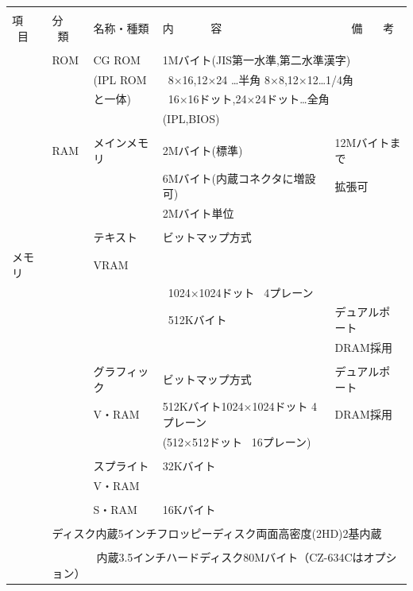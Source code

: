 \documentclass[twoside,a4paper,12pt]{article}
\begin{document}
\setlength{\tabcolsep}{0.5mm}
\begin{tabular}{|p{17mm}|p{13mm}|p{23mm}|p{80mm}|p{30mm}|}
\hline
& & & &\\[-2mm]
項 \ 目& 分 \ 類 & 名称・種類 & 内 \ \ \ \ \ \ 容 & \ \ \ 備 \ \ \ 考\\[1mm]
\hline
& & & \multicolumn{2}{l|}{}\\[-3mm]
& ROM & CG ROM & \multicolumn{2}{l|}{1Mバイト(JIS第一水準,第二水準漢字)}\\
& & (IPL ROM & \multicolumn{2}{l|}{\ 8×16,12×24 …半角 8×8,12×12…1/4角}\\
& & と一体) & \multicolumn{2}{l|}{\ 16×16ドット,24×24ドット…全角}\\
& & & \multicolumn{2}{l|}{(IPL,BIOS)}\\
\cline{2-5}
& & & &\\[-3mm]
& RAM & メインメモリ & 2Mバイト(標準) & 12Mバイトまで\\
& & & 6Mバイト(内蔵コネクタに増設可) & 拡張可\\
& & & 2Mバイト単位 &\\
\cline{3-5}
& & & &\\[-3mm]
& & テキスト & ビットマップ方式 &\\
メモリ & & VRAM & &\\
& & & \ 1024×1024ドット \ 4プレーン &\\
& & & \ 512Kバイト & デュアルポート\\
& & & & DRAM採用\\
\cline{3-5}
& & & &\\[-3mm]
& & グラフィック & ビットマップ方式 & デュアルポート\\
& & V・RAM & 512Kバイト1024×1024ドット 4プレーン & DRAM採用\\
& & & (512×512ドット \ 16プレーン) &\\
\cline{3-5}
& & & \multicolumn{2}{l|}{}\\[-3mm]
& & スプライト & \multicolumn{2}{l|}{32Kバイト}\\
& & V・RAM & \multicolumn{2}{l|}{}\\
\cline{3-5}
& & & \multicolumn{2}{l|}{}\\[-3mm]
& & S・RAM & \multicolumn{2}{l|}{16Kバイト}\\
\hline
& \multicolumn{4}{l|}{}\\[-3mm]
& \multicolumn{4}{l|}{ディスク内蔵5インチフロッピーディスク両面高密度(2HD)2基内蔵}\\
& \multicolumn{4}{l|}{}\\
& \multicolumn{4}{l|}{\ \ \ \ \ \ \ \ 内蔵3.5インチハードディスク80Mバイト（CZ-634Cはオプション）}\\

\end{tabular}
\end{document}

